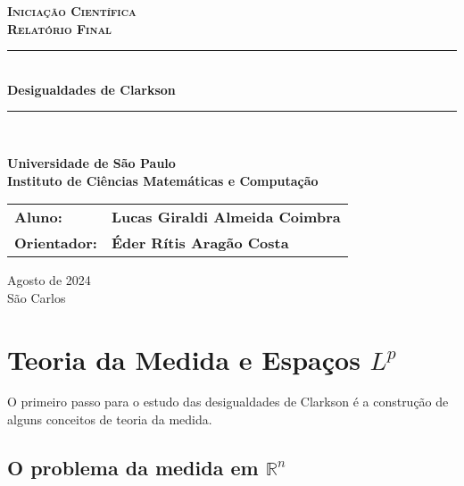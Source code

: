 \documentclass{article}
\begin{document}
\begin{titlepage}
    \center
    \textsc{\textbf{\Large Iniciação Científica}}\\[0.5cm]
    \textsc{\textbf{\large Relatório Final}}\\[0.5cm]
    
    \vspace{4cm}
    
    \rule{\linewidth}{0.5mm}\\[0.4cm]
    {\huge \textbf{Desigualdades de Clarkson}}
    \rule{\linewidth}{0.5mm}\\[1.0cm]
    
    \vspace{1.0cm}
    
    \textbf{\Large{Universidade de São Paulo}}\\[0.2cm]
    \textbf{\large{Instituto de Ciências Matemáticas e Computação}}
    \vspace{4cm}
    
    \begin{flushright}
        \begin{tabular}{@{}ll@{}}
            \hspace{1cm}\textbf{\large{Aluno:}} & \textbf{\large{Lucas Giraldi Almeida Coimbra}}\\
            \hspace{1cm}\textbf{\large{Orientador:}} & \textbf{\large{Éder Rítis Aragão Costa}}\\
            \end{tabular}
    \end{flushright}
    
    \vfill
    \Large{Agosto de 2024}\\[0.2cm]
    \Large{São Carlos}
\end{titlepage}

\newpage

\tableofcontents

\newpage

\section{Teoria da Medida e Espaços \texorpdfstring{$L^p$}{Lp}}

O primeiro passo para o estudo das desigualdades de Clarkson é a construção de alguns conceitos de teoria da medida.

\subsection{O problema da medida em \texorpdfstring{$\mathbb{R}^n$}{Rn}}
\end{document}
